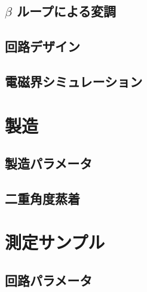     \subsection{$\beta$ ループによる変調}

    \subsection{回路デザイン}

    \subsection{電磁界シミュレーション}
    

\section{製造}

    \subsection{製造パラメータ}

    \subsection{二重角度蒸着}

\section{測定サンプル}

    \subsection{回路パラメータ}
